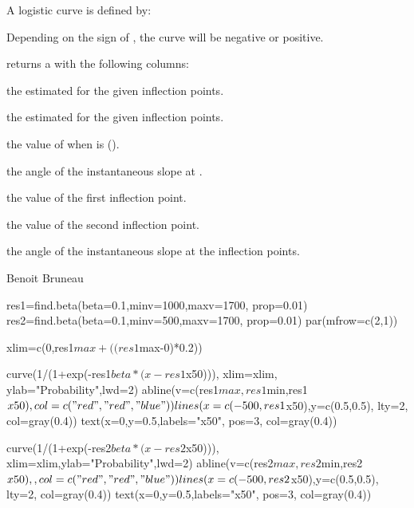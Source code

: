\documentclass[a4paper]{book}
\begin{document}
%
\begin{Details}\relax
A logistic curve is defined by:


Depending on the sign of \eqn{\beta}{}, the curve will be negative or positive.
\end{Details}
%
\begin{Value}
 returns a  with the following columns:

\begin{ldescription}
\item[\code{beta}] the estimated \eqn{\beta}{} for the given inflection points.
\item[\code{alpha}] the estimated \eqn{\alpha}{} for the given inflection points.
\item[\code{x50}] the value of  when  is  ().
\item[\code{angle.x50}] the angle of the instantaneous slope at .
\item[\code{min}] the value of the first inflection point.
\item[\code{max}] the value of the second inflection point.
\item[\code{angle.infl}] the angle of the instantaneous slope at the inflection points.
\end{ldescription}
\end{Value}
%
\begin{Author}\relax
Benoit Bruneau
\end{Author}
%
\begin{SeeAlso}\relax
{}
\end{SeeAlso}
%
\begin{Examples}
\begin{ExampleCode}
res1=find.beta(beta=0.1,minv=1000,maxv=1700, prop=0.01)
res2=find.beta(beta=0.1,minv=500,maxv=1700, prop=0.01)
par(mfrow=c(2,1))

xlim=c(0,res1$max+((res1$max-0)*0.2))

curve(1/(1+exp(-res1$beta*(x-res1$x50))), xlim=xlim, ylab="Probability",lwd=2)
abline(v=c(res1$max,res1$min,res1$x50), col=c("red","red","blue"))
lines(x=c(-500,res1$x50),y=c(0.5,0.5), lty=2, col=gray(0.4))
text(x=0,y=0.5,labels="x50", pos=3, col=gray(0.4))

curve(1/(1+exp(-res2$beta*(x-res2$x50))), xlim=xlim,ylab="Probability",lwd=2)
abline(v=c(res2$max,res2$min,res2$x50),, col=c("red","red","blue"))
lines(x=c(-500,res2$x50),y=c(0.5,0.5), lty=2, col=gray(0.4))
text(x=0,y=0.5,labels="x50", pos=3, col=gray(0.4))
\end{ExampleCode}
\end{Examples}
\end{document}
